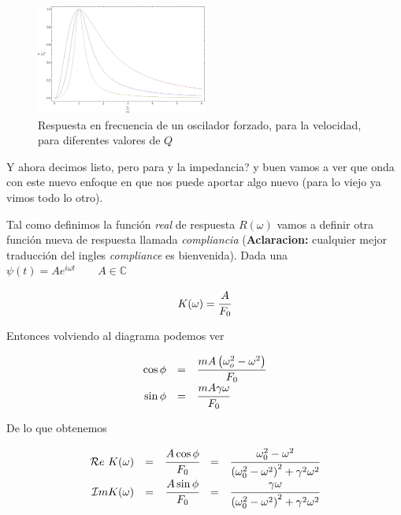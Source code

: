 \documentclass[a4paper,spanish]{article}
\def\Rea {\mathcal{R}e}
\def\Ima {\mathcal{I}m}
\def\C {\mathbb{C}}
\numberwithin{equation}{section}
\begin{document}
\begin{figure}[H]
  \centering
  \includegraphics[width=0.5\textwidth]{Imagenes/resonancia.png}
  \caption{Respuesta en frecuencia de un oscilador forzado, para la velocidad, para diferentes valores de $Q$}
  \label{fig:oscilador_forzado_respuesta}
\end{figure}

Y ahora decimos listo, pero para y la impedancia? y buen vamos a ver que onda con este nuevo enfoque en que nos puede aportar algo nuevo (para lo viejo ya vimos todo lo otro).

Tal como definimos la funci\'on \textit{real} de respuesta $R(\omega)$ vamos a definir otra funci\'on nueva de respuesta llamada \textit{compliancia} (\textbf{Aclaracion:} cualquier mejor traducci\'on del ingles \textit{compliance} es bienvenida).
Dada una $\psi (t) = A e^{i\omega t}\qquad A\in\C$

\begin{equation}
K(\omega)=\cfrac{A}{F_0}
\end{equation}

Entonces volviendo al diagrama podemos ver

\begin{equation*}
\begin{array}{rcl}
\cos{\phi} & = & \cfrac{mA\left(\omega_o ^2 - \omega^2\right)}{F_0} \\
\sin{\phi} & = & \cfrac{mA\gamma\omega}{F_0}
\end{array}
\end{equation*}

De lo que obtenemos

\begin{equation}
\begin{array}{rcccl}
\Rea \ {K(\omega)} & = & \cfrac{A\cos{\phi}}{F_0} & = & \cfrac{\omega_0 ^2 - \omega^2}{\left(\omega_0 ^2 - \omega^2\right)^2 + \gamma^2\omega^2} \\
\Ima{K(\omega)} & = & \cfrac{A\sin{\phi}}{F_0} & = & \cfrac{\gamma\omega}{\left(\omega_0 ^2 - \omega^2\right)^2 + \gamma^2\omega^2} 
\end{array}
\end{equation}
\end{document}
